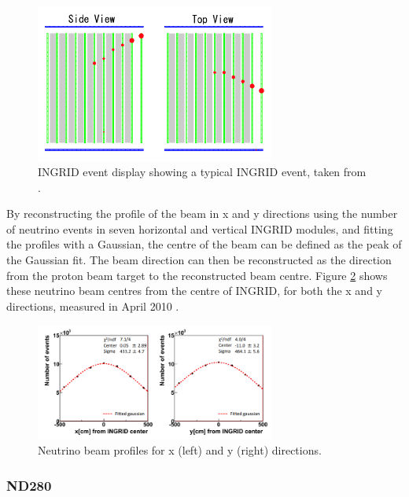 \begin{figure}
    \centering
    \includegraphics[width=0.7\textwidth]{Figures/ingridevent.png}
    \caption{INGRID event display showing a typical INGRID event, taken from \cite{t2k_collaboration_t2k_2011}.}
    \label{fig:ingridevent}
\end{figure}

By reconstructing the profile of the beam in x and y directions using the number of neutrino events in seven horizontal and vertical INGRID modules, and fitting the profiles with a Gaussian, the centre of the beam can be defined as the peak of the Gaussian fit. The beam direction can then be reconstructed as the direction from the proton beam target to the reconstructed beam centre. Figure \ref{fig:INGRID_centre} shows these neutrino beam centres from the centre of INGRID, for both the x and y directions, measured in April 2010 \cite{Abe_2012}.


\begin{figure}
    \centering
    \includegraphics[width=0.7\textwidth]{Figures/INGRID_centre.png}
    \caption{Neutrino beam profiles for x (left) and y (right) directions.}
    \label{fig:INGRID_centre}
\end{figure}



\subsubsection{ND280}

